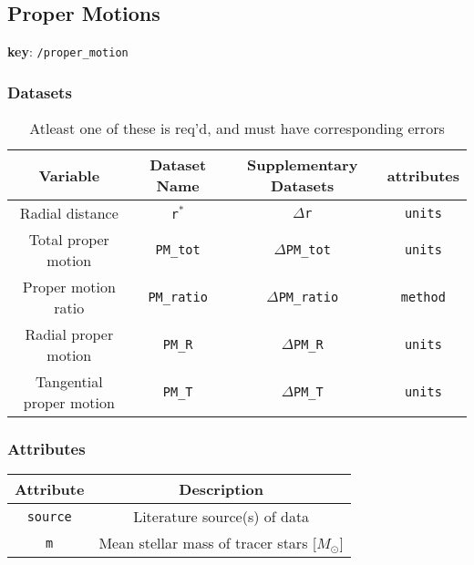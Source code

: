 \subsection{Proper Motions}

\textbf{key}: \texttt{/proper\_motion}

\subsubsection{Datasets}

\begin{center}
\begin{table}
\begin{tabular}{ | c | c | c | c | }
    \hline
    Variable & Dataset Name & Supplementary Datasets &  attributes \\
    \hline\hline
    Radial distance & \texttt{r\(^*\)} & \texttt{\(\Delta\)r} & \texttt{units} \\
    \hline
    Total proper motion & \texttt{PM\_tot} & \texttt{\(\Delta\)PM\_tot} &
    \texttt{units}\\
    \hline
    Proper motion ratio & \texttt{PM\_ratio} & \texttt{\(\Delta\)PM\_ratio} &
    \texttt{method} \\
    \hline
    Radial proper motion & \texttt{PM\_R} & \texttt{\(\Delta\)PM\_R} &
    \texttt{units}\\
    \hline
    Tangential proper motion & \texttt{PM\_T} & \texttt{\(\Delta\)PM\_T} &
    \texttt{units}\\
    \hline
\end{tabular}
\caption*{Atleast one of these is req'd, and must have corresponding errors}
\end{table}
\end{center}

\subsubsection{Attributes}


\begin{center}
\begin{tabular}{ | c | c | }
    \hline
    Attribute & Description \\
    \hline\hline
    \texttt{source} & Literature source(s) of data \\
    \hline
    \texttt{m} & Mean stellar mass of tracer stars [\(M_\odot\)] \\
    \hline
\end{tabular}
\end{center}

